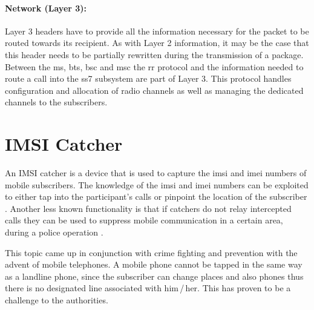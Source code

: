 \paragraph{Network (Layer 3):} Layer 3 headers have to provide all the information necessary for the packet to be routed towards its recipient.
As with Layer 2 information, it may be the case that this header needs to be partially rewritten during the transmission of a package.
Between the \gls{ms}, \gls{bts}, \gls{bsc} and \gls{msc} the \gls{rr} protocol and the information needed to route a call into the \gls{ss7} subsystem are part of Layer 3.
This protocol handles configuration and allocation of radio channels as well as managing the dedicated channels to the subscribers.

\section{IMSI Catcher}
\label{sec:catcher}
An IMSI catcher is a device that is used to capture the \gls{imsi} and \gls{imei} numbers of mobile subscribers.
The knowledge of the \gls{imsi} and \gls{imei} numbers can be exploited to either tap into the participant's calls or pinpoint the location of the subscriber \cite{fox}.
Another less known functionality is that if catchers do not relay intercepted calls they can be used to suppress mobile communication in a certain area, \eg during a police operation \cite{imsi_wiki}.

This topic came up in conjunction with crime fighting and prevention with the advent of mobile telephones.
A mobile phone cannot be tapped in the same way as a landline phone, since the subscriber can change places and also phones thus there is no designated line associated with him\,/\,her.
This has proven to be a challenge to the authorities.

